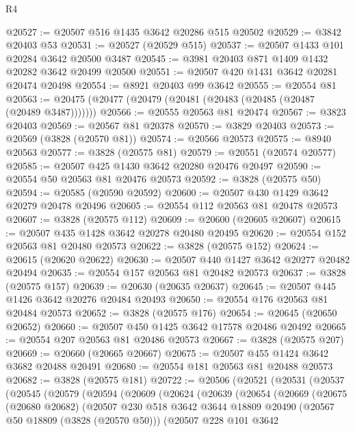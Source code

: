 \begin{lexlean}{R4}
\begin{coremodule}
@20527 := @20507 @516 @1435 @3642 @20286 @515 @20502
@20529 := @3842 @20403 @53
@20531 := @20527 (@20529 @515)
@20537 := @20507 @1433 @101 @20284 @3642 @20500 @3487
@20545 := @3981 @20403 @871 @1409 @1432 @20282 @3642 @20499 @20500
@20551 := @20507 @420 @1431 @3642 @20281 @20474 @20498
@20554 := @8921 @20403 @99 @3642
@20555 := @20554 @81
@20563 := @20475 (@20477 (@20479 (@20481 (@20483 (@20485 (@20487 (@20489 @3487)))))))
@20566 := @20555 @20563 @81 @20474
@20567 := @3823 @20403
@20569 := @20567 @81 @20378
@20570 := @3829 @20403
@20573 := @20569 (@3828 (@20570 @81))
@20574 := @20566 @20573
@20575 := @8940 @20563
@20577 := @3828 (@20575 @81)
@20579 := @20551 (@20574 @20577)
@20585 := @20507 @425 @1430 @3642 @20280 @20476 @20497
@20590 := @20554 @50 @20563 @81 @20476 @20573
@20592 := @3828 (@20575 @50)
@20594 := @20585 (@20590 @20592)
@20600 := @20507 @430 @1429 @3642 @20279 @20478 @20496
@20605 := @20554 @112 @20563 @81 @20478 @20573
@20607 := @3828 (@20575 @112)
@20609 := @20600 (@20605 @20607)
@20615 := @20507 @435 @1428 @3642 @20278 @20480 @20495
@20620 := @20554 @152 @20563 @81 @20480 @20573
@20622 := @3828 (@20575 @152)
@20624 := @20615 (@20620 @20622)
@20630 := @20507 @440 @1427 @3642 @20277 @20482 @20494
@20635 := @20554 @157 @20563 @81 @20482 @20573
@20637 := @3828 (@20575 @157)
@20639 := @20630 (@20635 @20637)
@20645 := @20507 @445 @1426 @3642 @20276 @20484 @20493
@20650 := @20554 @176 @20563 @81 @20484 @20573
@20652 := @3828 (@20575 @176)
@20654 := @20645 (@20650 @20652)
@20660 := @20507 @450 @1425 @3642 @17578 @20486 @20492
@20665 := @20554 @207 @20563 @81 @20486 @20573
@20667 := @3828 (@20575 @207)
@20669 := @20660 (@20665 @20667)
@20675 := @20507 @455 @1424 @3642 @3682 @20488 @20491
@20680 := @20554 @181 @20563 @81 @20488 @20573
@20682 := @3828 (@20575 @181)
@20722 := @20506
    (@20521
      (@20531
        (@20537
          (@20545
            (@20579
              (@20594
                (@20609
                  (@20624
                    (@20639
                      (@20654
                        (@20669
                          (@20675
                            (@20680 @20682)
                            (@20507
                              @230
                              @518
                              @3642
                              @3644
                              @18809
                              @20490
                              (@20567 @50 @18809 (@3828 (@20570 @50)))
                              (@20507
                                @228
                                @101
                                @3642

\end{coremodule}
\end{lexlean}
